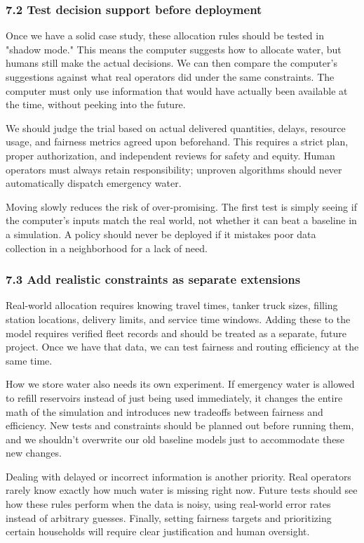 \documentclass[conference]{IEEEtran}
\begin{document}
\subsubsection{7.2 Test decision support before deployment}
Once we have a solid case study, these allocation rules should be tested in "shadow mode." This means the computer suggests how to allocate water, but humans still make the actual decisions. We can then compare the computer's suggestions against what real operators did under the same constraints. The computer must only use information that would have actually been available at the time, without peeking into the future.

We should judge the trial based on actual delivered quantities, delays, resource usage, and fairness metrics agreed upon beforehand. This requires a strict plan, proper authorization, and independent reviews for safety and equity. Human operators must always retain responsibility; unproven algorithms should never automatically dispatch emergency water.

Moving slowly reduces the risk of over-promising. The first test is simply seeing if the computer's inputs match the real world, not whether it can beat a baseline in a simulation. A policy should never be deployed if it mistakes poor data collection in a neighborhood for a lack of need.

\subsubsection{7.3 Add realistic constraints as separate extensions}
Real-world allocation requires knowing travel times, tanker truck sizes, filling station locations, delivery limits, and service time windows. Adding these to the model requires verified fleet records and should be treated as a separate, future project. Once we have that data, we can test fairness and routing efficiency at the same time.

How we store water also needs its own experiment. If emergency water is allowed to refill reservoirs instead of just being used immediately, it changes the entire math of the simulation and introduces new tradeoffs between fairness and efficiency. New tests and constraints should be planned out before running them, and we shouldn't overwrite our old baseline models just to accommodate these new changes.

Dealing with delayed or incorrect information is another priority. Real operators rarely know exactly how much water is missing right now. Future tests should see how these rules perform when the data is noisy, using real-world error rates instead of arbitrary guesses. Finally, setting fairness targets and prioritizing certain households will require clear justification and human oversight.
\end{document}
